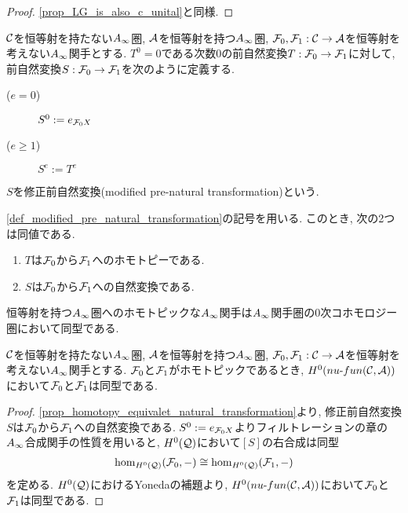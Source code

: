 \documentclass[uplatex, a4paper, 14Q, dvipdfmx]{jsarticle}
\begin{document}
\begin{proof}
  \cref{prop_LG_is_also_c_unital}と同様. 
\end{proof}

\begin{definition}[修正前自然変換] \label{def_modified_pre_natural_transformation}
  $\mathcal{C}$を恒等射を持たない$A_{\infty}$圏, $\mathcal{A}$を恒等射を持つ$A_{\infty}$圏, $\mathcal{F}_0,\mathcal{F}_1 : \mathcal{C} \to \mathcal{A}$を恒等射を考えない$A_{\infty}$関手とする. 
  $T^0 = 0$である次数$0$の前自然変換$T : \mathcal{F}_0 \to \mathcal{F}_1$に対して, 前自然変換$S : \mathcal{F}_0 \to \mathcal{F}_1$を次のように定義する. 
  \begin{description}
    \item[($e=0$)] $S^0 := e_{\mathcal{F}_0 X}$
    \item[($e \geq 1$)] $S^e := T^e$
  \end{description}
  $S$を修正前自然変換(modified pre-natural transformation)という. 
\end{definition}

\begin{lemma} \label{prop_homotopy_equivalet_natural_transformation}
  \cref{def_modified_pre_natural_transformation}の記号を用いる.
  このとき, 次の2つは同値である.
  \begin{enumerate}
    \item $T$は$\mathcal{F}_0$から$\mathcal{F}_1$へのホモトピーである. 
    \item $S$は$\mathcal{F}_0$から$\mathcal{F}_1$への自然変換である.
  \end{enumerate}
\end{lemma}

恒等射を持つ$A_{\infty}$圏へのホモトピックな$A_{\infty}$関手は$A_{\infty}$関手圏の$0$次コホモロジー圏において同型である. 

\begin{lemma} \label{prop_homotopic_is_iso_in_H^0}
  $\mathcal{C}$を恒等射を持たない$A_{\infty}$圏, $\mathcal{A}$を恒等射を持つ$A_{\infty}$圏, $\mathcal{F}_0,\mathcal{F}_1 : \mathcal{C} \to \mathcal{A}$を恒等射を考えない$A_{\infty}$関手とする. 
  $\mathcal{F}_0$と$\mathcal{F}_1$がホモトピックであるとき, $H^0(nu \text{-} fun (\mathcal{C}, \mathcal{A}))$において$\mathcal{F}_0$と$\mathcal{F}_1$は同型である. 
\end{lemma}

\begin{proof}
  \cref{prop_homotopy_equivalet_natural_transformation}より, 修正前自然変換$S$は$\mathcal{F}_0$から$\mathcal{F}_1$への自然変換である. 
  $S^0 := e_{\mathcal{F}_0 X}$よりフィルトレーションの章の$A_{\infty}$合成関手の性質を用いると, $H^0(\mathcal{Q})$において$[S]$の右合成は同型 
  \begin{align*}
    \hom_{H^0(\mathcal{Q})}(\mathcal{F}_0,-) \cong \hom_{H^0(\mathcal{Q})}(\mathcal{F}_1,-)
  \end{align*}
  を定める. 
  $H^0(\mathcal{Q})$におけるYonedaの補題より, $H^0(nu \text{-} fun (\mathcal{C}, \mathcal{A}))$において$\mathcal{F}_0$と$\mathcal{F}_1$は同型である. 
\end{proof}
\end{document}
